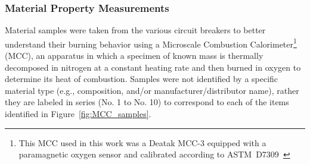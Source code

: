 \subsubsection{Material Property Measurements}
\label{ssec:MCC}
Material samples were taken from the various circuit breakers to better understand their burning behavior using a Microscale Combustion Calorimeter\footnote{This MCC used in this work was a Deatak MCC-3 equipped with a paramagnetic oxygen sensor and calibrated according to ASTM~D7309~\cite{ASTMD7309}} (MCC), an apparatus in which a specimen of known mass is thermally decomposed in nitrogen at a constant heating rate and then burned in oxygen to determine its heat of combustion. Samples were not identified by a specific material type (e.g., composition, and/or manufacturer/distributor name), rather they are labeled in series (No. 1 to No. 10) to correspond to each of the items identified in Figure~\ref{fig:MCC_samples}.



